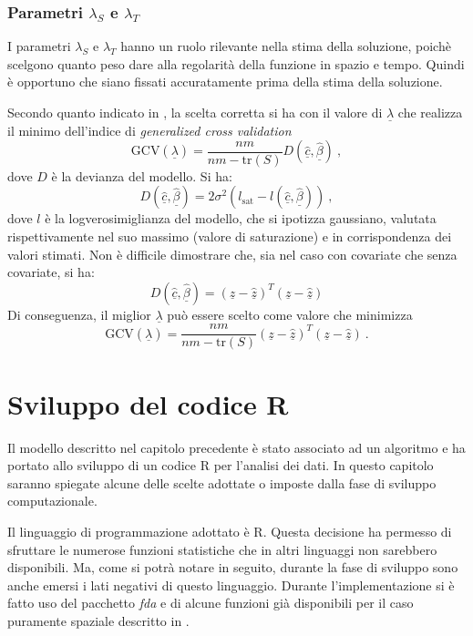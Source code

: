 \documentclass[a4paper,11pt,twoside,openright]{book}							%
\begin{document}
\subsection{Parametri $\lambda_S$ e $\lambda_T$}
I parametri $\lambda_S$ e $\lambda_T$ hanno un ruolo rilevante nella stima della soluzione, poichè scelgono quanto peso dare alla regolarità della funzione in spazio e tempo. Quindi è opportuno che siano fissati accuratamente prima della stima della soluzione.

Secondo quanto indicato in \cite{art:marra}, la scelta corretta si ha con il valore di $\underline \lambda$ che realizza il minimo dell'indice di \textit{generalized cross validation}
$$
\mathrm{GCV}(\underline \lambda) =\frac{nm}{nm-\text{tr}(S)}  D(\hat  {\underline c},\hat  {\underline \beta}) \ ,
$$
dove $D$ è la devianza del modello. Si ha:
$$
D(\hat  {\underline c},\hat  {\underline \beta})=2\sigma^2(l_{\mathrm{sat}}-l(\hat  {\underline c},\hat  {\underline \beta})) \ ,
$$
dove $l$ è la logverosimiglianza del modello, che si ipotizza gaussiano, valutata rispettivamente nel suo massimo (valore di saturazione) e in corrispondenza dei valori stimati. Non è difficile dimostrare che, sia nel caso con covariate che senza covariate, si ha: 
$$
D(\hat  {\underline c},\hat  {\underline \beta}) = (\underline z - \hat  {\underline z})^T(\underline z - \hat  {\underline z})
$$
Di conseguenza, il miglior $\underline \lambda$ può essere scelto come valore che minimizza
\begin{equation}
\label{eq:GCV}
\mathrm{GCV}(\underline \lambda) =\frac{nm}{nm-\text{tr}(S)}  (\underline z - \hat  {\underline z})^T(\underline z - \hat  {\underline z}) \ .
\end{equation}

\chapter{Sviluppo del codice R}
\label{cap:Codice}
Il modello descritto nel capitolo precedente è stato associato ad un algoritmo e ha portato allo sviluppo di un codice R per l'analisi dei dati. In questo capitolo saranno spiegate alcune delle scelte adottate o imposte dalla fase di sviluppo computazionale.

Il linguaggio di programmazione adottato è R. Questa decisione ha permesso di sfruttare le numerose funzioni statistiche che in altri linguaggi non sarebbero disponibili. Ma, come si potrà notare in seguito, durante la fase di sviluppo sono anche emersi i lati negativi di questo linguaggio. Durante l'implementazione si è fatto uso del pacchetto \textit{fda} e di alcune funzioni già disponibili per il caso puramente spaziale descritto in \cite{art:sangalli}.
\end{document}
